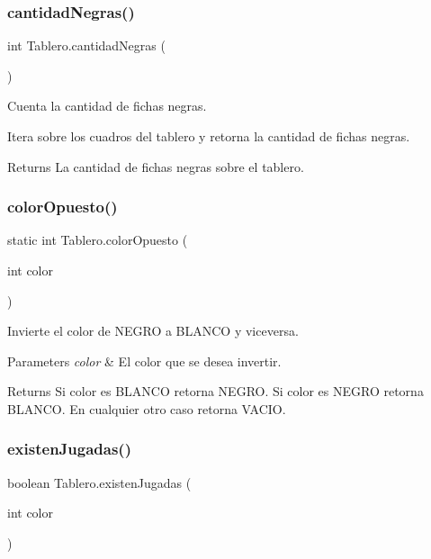 \subsubsection{\texorpdfstring{cantidad\+Negras()}{cantidadNegras()}}
{\footnotesize\ttfamily int Tablero.\+cantidad\+Negras (\begin{DoxyParamCaption}{ }\end{DoxyParamCaption})}



Cuenta la cantidad de fichas negras. 

Itera sobre los cuadros del tablero y retorna la cantidad de fichas negras.

\begin{DoxyReturn}{Returns}
La cantidad de fichas negras sobre el tablero. 
\end{DoxyReturn}
\mbox{\label{class_tablero_a0cdaee39a2bd8bd7fa59b2c19958650c}} 
\subsubsection{\texorpdfstring{color\+Opuesto()}{colorOpuesto()}}
{\footnotesize\ttfamily static int Tablero.\+color\+Opuesto (\begin{DoxyParamCaption}\item[{int}]{color }\end{DoxyParamCaption})\hspace{0.3cm}{\ttfamily [static]}}



Invierte el color de N\+E\+G\+RO a B\+L\+A\+N\+CO y viceversa. 


\begin{DoxyParams}{Parameters}
{\em color} & El color que se desea invertir. \\
\hline
\end{DoxyParams}
\begin{DoxyReturn}{Returns}
Si color es B\+L\+A\+N\+CO retorna N\+E\+G\+RO. Si color es N\+E\+G\+RO retorna B\+L\+A\+N\+CO. En cualquier otro caso retorna V\+A\+C\+IO. 
\end{DoxyReturn}
\mbox{\label{class_tablero_a0b225d49792c0db4742c1e6aea909647}} 
\subsubsection{\texorpdfstring{existen\+Jugadas()}{existenJugadas()}}
{\footnotesize\ttfamily boolean Tablero.\+existen\+Jugadas (\begin{DoxyParamCaption}\item[{int}]{color }\end{DoxyParamCaption})}



